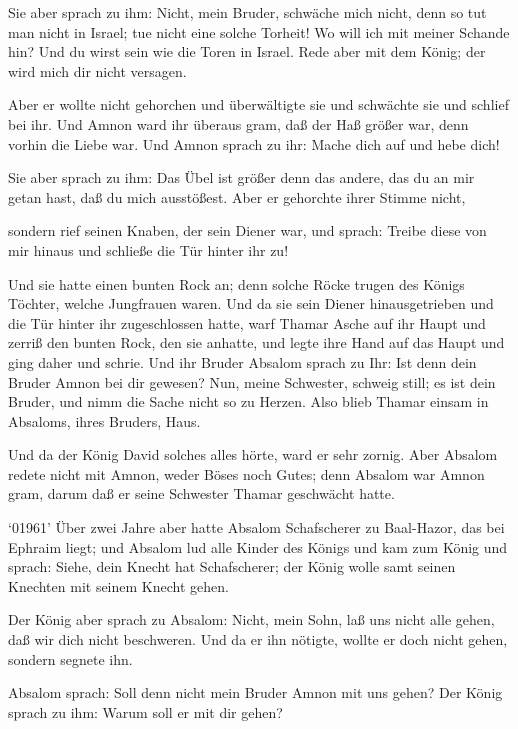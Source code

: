  Sie aber sprach zu ihm: Nicht, mein Bruder, schwäche mich
nicht, denn so tut man nicht in Israel; tue nicht eine solche Torheit!
 Wo will ich mit meiner Schande hin? Und du wirst sein wie
die Toren in Israel. Rede aber mit dem König; der wird mich dir nicht
versagen.

 Aber er wollte nicht gehorchen und überwältigte sie und
schwächte sie und schlief bei ihr.  Und Amnon ward ihr
überaus gram, daß der Haß größer war, denn vorhin die Liebe war. Und
Amnon sprach zu ihr: Mache dich auf und hebe dich!

 Sie aber sprach zu ihm: Das Übel ist größer denn das
andere, das du an mir getan hast, daß du mich ausstößest. Aber er
gehorchte ihrer Stimme nicht,

 sondern rief seinen Knaben, der sein Diener war, und
sprach: Treibe diese von mir hinaus und schließe die Tür hinter ihr zu!

 Und sie hatte einen bunten Rock an; denn solche Röcke
trugen des Königs Töchter, welche Jungfrauen waren. Und da sie sein
Diener hinausgetrieben und die Tür hinter ihr zugeschlossen hatte,
 warf Thamar Asche auf ihr Haupt und zerriß den bunten
Rock, den sie anhatte, und legte ihre Hand auf das Haupt und ging daher
und schrie.  Und ihr Bruder Absalom sprach zu Ihr: Ist denn
dein Bruder Amnon bei dir gewesen? Nun, meine Schwester, schweig still;
es ist dein Bruder, und nimm die Sache nicht so zu Herzen. Also blieb
Thamar einsam in Absaloms, ihres Bruders, Haus.

 Und da der König David solches alles hörte, ward er sehr
zornig. Aber Absalom redete nicht mit Amnon, weder Böses noch Gutes;
 denn Absalom war Amnon gram, darum daß er seine Schwester
Thamar geschwächt hatte.

 `01961' Über zwei Jahre aber hatte Absalom Schafscherer zu
Baal-Hazor, das bei Ephraim liegt; und Absalom lud alle Kinder des
Königs  und kam zum König und sprach: Siehe, dein Knecht
hat Schafscherer; der König wolle samt seinen Knechten mit seinem Knecht
gehen.

 Der König aber sprach zu Absalom: Nicht, mein Sohn, laß
uns nicht alle gehen, daß wir dich nicht beschweren. Und da er ihn
nötigte, wollte er doch nicht gehen, sondern segnete ihn.

 Absalom sprach: Soll denn nicht mein Bruder Amnon mit uns
gehen? Der König sprach zu ihm: Warum soll er mit dir gehen?

